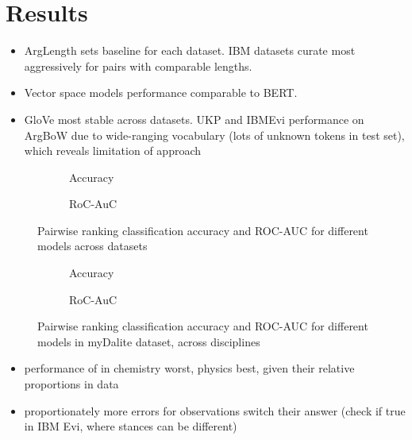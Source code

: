 \documentclass[runningheads]{llncs}
\begin{document}
\section{Results}

\begin{itemize}
	\item ArgLength sets baseline for each dataset. IBM datasets curate most 
	aggressively for pairs with comparable lengths.
	\item Vector space models performance comparable to BERT.
	\item GloVe most stable across datasets. UKP and IBMEvi performance on 
	ArgBoW due to wide-ranging vocabulary (lots of unknown tokens in test set), 
	which reveals limitation of approach 
\end{itemize}

\begin{figure}
	\begin{subfigure}[t]{0.5\linewidth}
		\centering
		\scalebox{0.5}{}
		\caption{Accuracy}
	\end{subfigure}%
	\qquad
	\begin{subfigure}[t]{0.5\linewidth}
		\centering
		\scalebox{0.5}{}
		\caption{RoC-AuC}
	\end{subfigure}
		\caption{Pairwise ranking classification accuracy and ROC-AUC for 
		different models across datasets}
	\label{fig:performance}
\end{figure}


\begin{figure}
	\begin{subfigure}[t]{0.5\linewidth}
		\centering
		\scalebox{0.5}{}
		\caption{Accuracy}
	\end{subfigure}%
	\qquad
	\begin{subfigure}[t]{0.5\linewidth}
		\centering
		\scalebox{0.5}{}
		\caption{RoC-AuC}
	\end{subfigure}	
		\caption{Pairwise ranking classification accuracy and ROC-AUC for 
		different models in myDalite dataset, across disciplines}
		\label{fig:performance_dalite}
\end{figure}

\begin{itemize}
	\item performance of in chemistry worst, physics best, given their relative 
	proportions in data
	\item proportionately more errors for observations switch their answer 
	(check if true in IBM Evi, where stances can be different)
\end{itemize}
\end{document}
